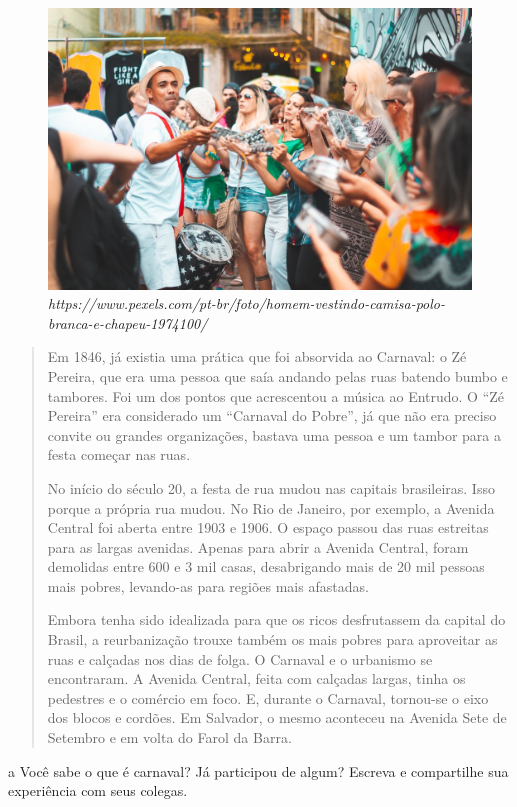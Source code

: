 \begin{figure}[htpb!]
\includegraphics[width=.5\textwidth]{./imgs/img40.png}
\caption{\emph{https://www.pexels.com/pt-br/foto/homem-vestindo-camisa-polo-branca-e-chapeu-1974100/} }
\end{figure}

\begin{quote}
Em 1846, já existia uma prática que foi absorvida ao Carnaval: o Zé
Pereira, que era uma pessoa que saía andando pelas ruas batendo bumbo e
tambores. Foi um dos pontos que acrescentou a música ao Entrudo. O ``Zé
Pereira'' era considerado um ``Carnaval do Pobre'', já que não era
preciso convite ou grandes organizações, bastava uma pessoa e um tambor
para a festa começar nas ruas.

No início do século 20, a festa de rua mudou nas capitais brasileiras.
Isso porque a própria rua mudou. No Rio de Janeiro, por exemplo, a
Avenida Central foi aberta entre 1903 e 1906. O espaço passou das ruas
estreitas para as largas avenidas. Apenas para abrir a Avenida Central,
foram demolidas entre 600 e 3 mil casas, desabrigando mais de 20 mil
pessoas mais pobres, levando-as para regiões mais afastadas.

Embora tenha sido idealizada para que os ricos desfrutassem da capital
do Brasil, a reurbanização trouxe também os mais pobres para aproveitar
as ruas e calçadas nos dias de folga. O Carnaval e o urbanismo se
encontraram. A Avenida Central, feita com calçadas largas, tinha os
pedestres e o comércio em foco. E, durante o Carnaval, tornou-se o eixo
dos blocos e cordões. Em Salvador, o mesmo aconteceu na Avenida Sete de
Setembro e em volta do Farol da Barra.

\end{quote}

\num{a} Você sabe o que é carnaval? Já participou de algum? Escreva e
compartilhe sua experiência com seus colegas.


